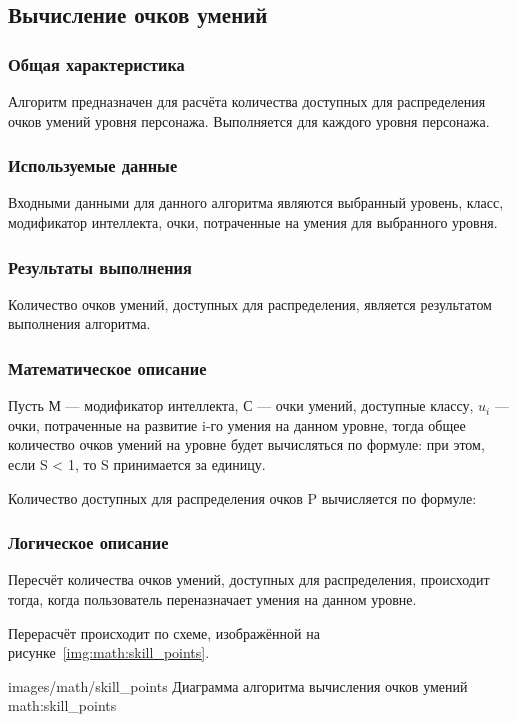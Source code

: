 \subsection{Вычисление очков умений}

\subsubsection{Общая характеристика}

Алгоритм предназначен для расчёта количества доступных для распределения очков умений уровня персонажа. Выполняется для каждого уровня персонажа.

\subsubsection{Используемые данные}

Входными данными для данного алгоритма являются выбранный уровень, класс, модификатор интеллекта, очки, потраченные на умения для выбранного уровня.

\subsubsection{Результаты выполнения}

Количество очков умений, доступных для распределения, является результатом выполнения алгоритма.

\subsubsection{Математическое описание}

Пусть $М$ --- модификатор интеллекта, $С$ --- очки умений, доступные классу, $u_i$ --- очки, потраченные на развитие i-го умения на данном уровне, тогда общее количество очков умений на уровне будет вычисляться по формуле:
при этом, если S < 1, то S принимается за единицу.

Количество доступных для распределения очков P вычисляется по формуле:

\subsubsection{Логическое описание}

Пересчёт количества очков умений, доступных для распределения, происходит тогда, когда пользователь переназначает умения на данном уровне.

Перерасчёт происходит по схеме, изображённой на рисунке~\ref{img:math:skill_points}.

            {images/math/skill_points}
            {Диаграмма алгоритма вычисления очков умений}
            {math:skill_points}
